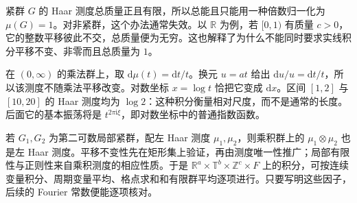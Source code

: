 紧群 \(G\) 的 Haar 测度总质量正且有限，所以总能且只能用一种倍数归一化为 \(\mu(G)=1\)。对非紧群，这个办法通常失效。以 \(\mathbb R\) 为例，若 \([0,1)\) 有质量 \(c>0\)，它的整数平移彼此不交，总质量便为无穷。这也解释了为什么不能同时要求实线积分平移不变、非零而且总质量为 \(1\)。

在 \((0,\infty)\) 的乘法群上，取 \(\mathrm d\mu(t)=\mathrm dt/t\)。换元 \(u=at\) 给出 \(\mathrm du/u=\mathrm dt/t\)，所以该测度不随乘法平移改变。对数坐标 \(x=\log t\) 恰把它变成 \(\mathrm dx\)。区间 \([1,2]\) 与 \([10,20]\) 的 Haar 测度均为 \(\log2\)：这种积分衡量相对尺度，而不是通常的长度。后面它的基本振荡将是 \(t^{2\pi\mathrm i\xi}\)，即对数坐标中的普通指数函数。

若 \(G_1,G_2\) 为第二可数局部紧群，配左 Haar 测度 \(\mu_1,\mu_2\)，则乘积群上的 \(\mu_1\otimes\mu_2\) 也是左 Haar 测度。平移不变性先在矩形集上验证，再由测度唯一性推广；局部有限性与正则性来自乘积测度的相应性质。于是 \(\mathbb R^a\times\mathbb T^b\times\mathbb Z^c\times F\) 上的积分，可按连续变量积分、周期变量平均、格点求和和有限群平均逐项进行。只要写明这些因子，后续的 Fourier 常数便能逐项核对。

